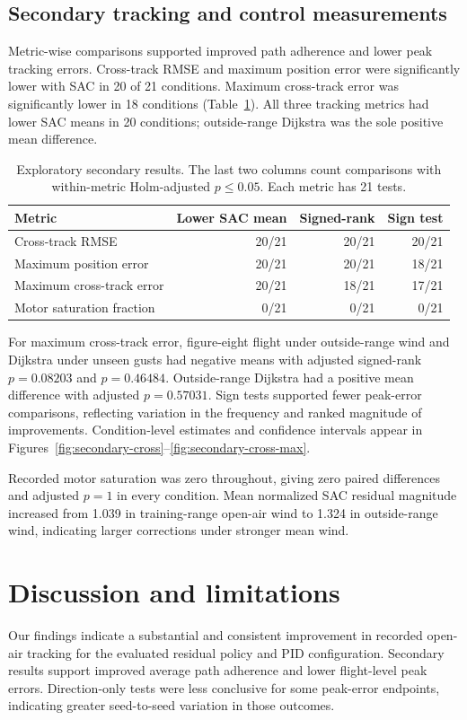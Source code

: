 \documentclass[11pt,a4paper]{article}
\begin{document}
\subsection{Secondary tracking and control measurements}
Metric-wise comparisons supported improved path adherence and lower peak tracking errors. Cross-track RMSE and maximum position error were significantly lower with SAC in 20 of 21 conditions. Maximum cross-track error was significantly lower in 18 conditions (Table~\ref{tab:secondary}). All three tracking metrics had lower SAC means in 20 conditions; outside-range Dijkstra was the sole positive mean difference.

\begin{table}[htbp]
\centering\small
\begin{tabular}{lrrr}
\toprule
Metric & Lower SAC mean & Signed-rank & Sign test \\
\midrule
Cross-track RMSE & 20/21 & 20/21 & 20/21 \\
Maximum position error & 20/21 & 20/21 & 18/21 \\
Maximum cross-track error & 20/21 & 18/21 & 17/21 \\
Motor saturation fraction & 0/21 & 0/21 & 0/21 \\
\bottomrule
\end{tabular}
\caption{Exploratory secondary results. The last two columns count comparisons with within-metric Holm-adjusted $p\leq0.05$. Each metric has 21 tests.}
\label{tab:secondary}
\end{table}

For maximum cross-track error, figure-eight flight under outside-range wind and Dijkstra under unseen gusts had negative means with adjusted signed-rank $p=0.08203$ and $p=0.46484$. Outside-range Dijkstra had a positive mean difference with adjusted $p=0.57031$. Sign tests supported fewer peak-error comparisons, reflecting variation in the frequency and ranked magnitude of improvements. Condition-level estimates and confidence intervals appear in Figures~\ref{fig:secondary-cross}--\ref{fig:secondary-cross-max}.

Recorded motor saturation was zero throughout, giving zero paired differences and adjusted $p=1$ in every condition. Mean normalized SAC residual magnitude increased from 1.039 in training-range open-air wind to 1.324 in outside-range wind, indicating larger corrections under stronger mean wind.

\section{Discussion and limitations}
Our findings indicate a substantial and consistent improvement in recorded open-air tracking for the evaluated residual policy and PID configuration. Secondary results support improved average path adherence and lower flight-level peak errors. Direction-only tests were less conclusive for some peak-error endpoints, indicating greater seed-to-seed variation in those outcomes.
\end{document}
